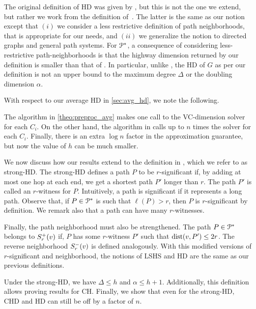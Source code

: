 The original definition of HD was given by \cite{highway2010}, but this is not the one we extend, but rather we work from the definition of~\cite{highway2013}.
The latter is the same as our notion except that $(i)$ we consider a less restrictive definition of path neighborhoods, that is appropriate for our needs, and $(ii)$ we generalize the notion to directed graphs and general path systems.
For $\mathcal{P}^*$, a consequence of considering less-restrictive path-neighborhoods is that the highway dimension returned by our definition is smaller than that of \cite{highway2013}.
In particular, unlike \cite{highway2013}, the HD of $G$ as per our definition is not an upper bound to the maximum degree $\Delta$ or the doubling dimension $\alpha$.

With respect to our average HD in \cref{sec:avg_hd}, we note the following.
\begin{remark}
The algorithm in \cref{theo:preproc_avg} makes one call to the VC-dimension solver for each $C_i$.
On the other hand, the algorithm in \cite{highway2013} calls up to $n$ times the solver for each $C_i$.
Finally, there is an extra $\log n$ factor in the approximation guarantee, but now the value of $h$ can be much smaller.
\end{remark}

We now discuss how our results extend to the definition in \cite{highway2013}, which we refer to as strong-HD.
The strong-HD defines a path $P$ to be $r$-significant if, by adding at most one hop at each end, we get a shortest path $P'$ longer than $r$.
The path $P'$ is called an $r$-witness for $P$.
Intuitively, a path is significant if it represents a long path.
Observe that, if $P\in\mathcal{P}^*$ is such that $\ell(P)>r$, then $P$ is $r$-significant by definition.
We remark also that a path can have many $r$-witnesses.

Finally, the path neighborhood must also be strengthened.
The path $P\in\mathcal{P}^*$ belongs to $S^+_r(v)$ if, $P$ has some $r$-witness $P'$ such that $\mbox{dist}(v,P')\leq 2r$.
The reverse neighborhood $S^-_r(v)$ is defined analogously.
With this modified versions of $r$-significant and neighborhood, the notions of LSHS and HD are the same as our previous definitions.

Under the strong-HD, we have  $\Delta\leq h$ and $\alpha\leq h+1$.
Additionally, this definition allows proving results for CH.
Finally, we show that even for the strong-HD, CHD and HD can still be off by a factor of $n$.

